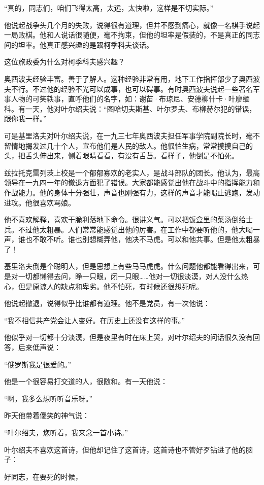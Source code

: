“真的，同志们，咱们飞得太高，太远，太快啦，这样是不切实际。”

他说起战争头几个月的失败，说得很有道理，但并不感到痛心，就像一名棋手说起一局败棋。他和人说话很随便，毫不拘束，但他的坦率是假装的，不是真正的同志间的坦率。他真正感兴趣的是跟柯季科夫谈话。

这位旅政委为什么对柯季科夫感兴趣？

奥西波夫经验丰富。善于了解人。这种经验非常有用，地下工作指挥部少了奥西波夫不行。不过他的经验不光可以成事，也可以碍事。有时奥西波夫说起一些著名军事人物的可笑轶事，直呼他们的名字，如：谢苗·布琼尼、安德柳什卡·叶廖缅科。有一天，他对叶尔绍夫说：“图哈切夫斯基、叶尔罗夫、布柳赫尔犯的错误，跟你我一样。”

可是基里洛夫对叶尔绍夫说，在一九三七年奥西波夫担任军事学院副院长时，毫不留情地揭发过几十个人，宣布他们是人民的敌人。他很怕生病，常常摸摸自己的头，把舌头伸出来，侧着眼睛看看，有没有舌苔。看样子，他倒是不怕死。

兹拉托克雷列茨上校是一个郁郁寡欢的老实人，是战斗部队的团长。他认为，最高领导在一九四一年的撤退方面犯了错误。大家都能感觉出他在战斗中的指挥能力和作战能力。他的身体十分强壮，声音也刚强有力，这样的声音才能喝止逃跑，发动进攻。他很喜欢骂娘。

他不喜欢解释，喜欢干脆利落地下命令。很讲义气。可以把饭盒里的菜汤倒给士兵。不过他太粗暴。人们常常能感觉出他的厉害。在工作中都要听他的，他大喝一声，谁也不敢不听。谁也别想糊弄他，他决不马虎。可以和他共事。但是他太粗暴了！

基里洛夫倒是个聪明人，但是思想上有些马马虎虎。什么问题他都能看得出来，可是对一切都懒得去问，睁一只眼，闭一只眼……他对一切很淡漠，对人没什么热心，但是原谅人的缺点和卑劣。他不怕死，有时候还很想死呢。

他说起撤退，说得似乎比谁都有道理。他不是党员，有一次他说：

“我不相信共产党会让人变好。在历史上还没有这样的事。”

他似乎对一切都十分淡漠，但是夜里有时在床上哭，对叶尔绍夫的问话很久没有回答，后来低声说：

“俄罗斯我是很爱的。”

他是一个很容易打交道的人，很随和。有一天他说：

“啊，我多么想听听音乐呀。”

昨天他带着傻笑的神气说：

“叶尔绍夫，您听着，我来念一首小诗。”

叶尔绍夫不喜欢这首诗，但他却记住了这首诗，这首诗也不管好歹钻进了他的脑子：

好同志，在要死的时候，

